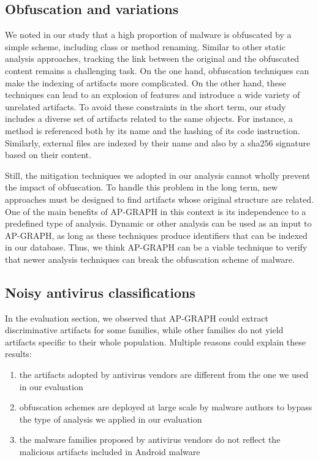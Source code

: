 \subsection{Obfuscation and variations}
We noted in our study that a high proportion of malware is obfuscated by a simple scheme, including class or method renaming.
Similar to other static analysis approaches, tracking the link between the original and the obfuscated content remains a challenging task.
On the one hand, obfuscation techniques can make the indexing of artifacts more complicated.
On the other hand, these techniques can lead to an explosion of features and introduce a wide variety of unrelated artifacts.
To avoid these constraints in the short term, our study includes a diverse set of artifacts related to the same objects.
For instance, a method is referenced both by its name and the hashing of its code instruction.
Similarly, external files are indexed by their name and also by a sha256 signature based on their content.

Still, the mitigation techniques we adopted in our analysis cannot wholly prevent the impact of obfuscation.
To handle this problem in the long term, new approaches must be designed to find artifacts whose original structure are related.
One of the main benefits of AP-GRAPH in this context is its independence to a predefined type of analysis.
Dynamic or other analysis can be used as an input to AP-GRAPH, as long as these techniques produce identifiers that can be indexed in our database.
Thus, we think AP-GRAPH can be a viable technique to verify that newer analysis techniques can break the obfuscation scheme of malware.
\subsection{Noisy antivirus classifications}
In the evaluation section, we observed that AP-GRAPH could extract discriminative artifacts for some families, while other families do not yield artifacts specific to their whole population.
Multiple reasons could explain these results:

\begin{enumerate}
	\item the artifacts adopted by antivirus vendors are different from the one we used in our evaluation
	\item obfuscation schemes are deployed at large scale by malware authors to bypass the type of analysis we applied in our evaluation
	\item the malware families proposed by antivirus vendors do not reflect the malicious artifacts included in Android malware
\end{enumerate}

